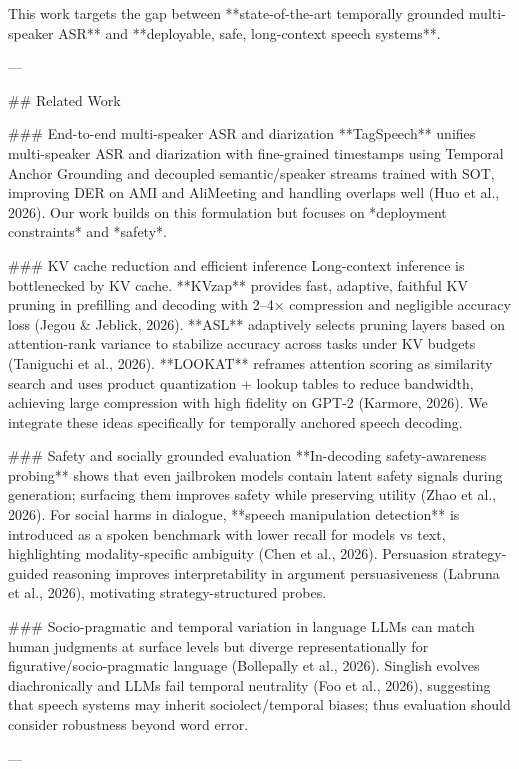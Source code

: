 This work targets the gap between **state-of-the-art temporally grounded multi-speaker ASR** and **deployable, safe, long-context speech systems**.

---

## Related Work  

### End-to-end multi-speaker ASR and diarization  
**TagSpeech** unifies multi-speaker ASR and diarization with fine-grained timestamps using Temporal Anchor Grounding and decoupled semantic/speaker streams trained with SOT, improving DER on AMI and AliMeeting and handling overlaps well (Huo et al., 2026). Our work builds on this formulation but focuses on *deployment constraints* and *safety*.

### KV cache reduction and efficient inference  
Long-context inference is bottlenecked by KV cache. **KVzap** provides fast, adaptive, faithful KV pruning in prefilling and decoding with 2–4× compression and negligible accuracy loss (Jegou & Jeblick, 2026). **ASL** adaptively selects pruning layers based on attention-rank variance to stabilize accuracy across tasks under KV budgets (Taniguchi et al., 2026). **LOOKAT** reframes attention scoring as similarity search and uses product quantization + lookup tables to reduce bandwidth, achieving large compression with high fidelity on GPT-2 (Karmore, 2026). We integrate these ideas specifically for temporally anchored speech decoding.

### Safety and socially grounded evaluation  
**In-decoding safety-awareness probing** shows that even jailbroken models contain latent safety signals during generation; surfacing them improves safety while preserving utility (Zhao et al., 2026). For social harms in dialogue, **speech manipulation detection** is introduced as a spoken benchmark with lower recall for models vs text, highlighting modality-specific ambiguity (Chen et al., 2026). Persuasion strategy-guided reasoning improves interpretability in argument persuasiveness (Labruna et al., 2026), motivating strategy-structured probes.

### Socio-pragmatic and temporal variation in language  
LLMs can match human judgments at surface levels but diverge representationally for figurative/socio-pragmatic language (Bollepally et al., 2026). Singlish evolves diachronically and LLMs fail temporal neutrality (Foo et al., 2026), suggesting that speech systems may inherit sociolect/temporal biases; thus evaluation should consider robustness beyond word error.

---

